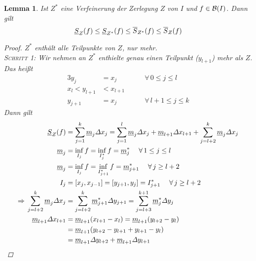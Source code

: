\documentclass[11pt, twoside, a4paper]{article}
\theoremstyle{plain}
\newtheorem{lemma}[blockelement]{Lemma}
\numberwithin{equation}{subsection}
\newcommand{\of}[1]{\mathopen{}\mathclose{}\bgroup\left(#1\aftergroup\egroup\right)}
\newcommand{\interv}[1]{\left[#1\right]}
\newcommand{\impl}[0]{\Rightarrow{}}
\newcommand{\fa}{\;\forall\,}
\newcommand{\mB}{\mathcal{B}}
\begin{document}


    \begin{lemma} %
        \label{lemma:temp-3}
        Ist $Z^{*}$ eine Verfeinerung der Zerlegung $Z$ von $I$ und $f\in \mB\of{I}$. Dann gilt
        \begin{align*}
            \underline{S}_Z\of{f} \leq \underline{S}_{Z^{*}}\of{f} \leq \overline{S}_{Z^{*}}\of{f} \leq \overline{S}_Z\of{f}
        \end{align*}
        \begin{proof}
            $Z^{*}$ enthält alle Teilpunkte von $Z$, nur mehr.\\[10pt]
            \textsc{Schritt 1:} Wir nehmen an $Z^{*}$ enthielte genau einen Teilpunkt ($y_{l+1}$) mehr als $Z$. Das heißt
            \begin{alignat*}{3}
                y_j &= x_j\quad &&\fa 0\leq j \leq l\\
                x_l < y_{l+1} &< x_{l+1}\quad &&\\
                y_{j+1} &= x_j\quad &&\fa l+ 1 \leq j \leq k
            \end{alignat*}
            Dann gilt
            \begin{align*}
                \underline{S}_Z\of{f} &= \sum_{j=1}^{k} \underline{m}_j\varDelta x_j = \sum_{j=1}^{l} \underline{m}_j \varDelta x_j + \underline{m}_{l+1}\varDelta x_{l+1} + \sum_{j=l+2}^{k} \underline{m}_j \varDelta x_j\\
                \underline{m}_j &= \inf_{I_j} f = \inf_{I_j^{*}} f = \underline{m}_j^{*}\quad \fa 1 \leq j \leq l\\
                \underline{m}_j &= \inf_{I_j} f = \inf_{I_{j+1}^{*}}f = \underline{m}_{j+1}^{*}\quad \fa j\geq l+2\\
                I_j &= \interv{x_j, x_{j-1}} = \interv{y_{j+1}, y_j} = I_{j+1}^{*}\quad\fa j \geq l+2\\
                \impl \sum_{j=l+2}^{k} \underline{m}_j \varDelta x_j &= \sum_{j=l+2}^{k} \underline{m}_{j+1}^{*} \varDelta y_{j+1} = \sum_{j=l+3}^{k+1} \underline{m}_j^{*} \varDelta y_{j}\\
                \underline{m}_{l+1} \varDelta x_{l+1} &= \underline{m}_{l+1}\of{x_{l+1} - x_l} = \underline{m}_{l+1}\of{y_{l+2}-y_l}\\
                &= \underline{m}_{l+1}\of{y_{l+2} - y_{l+1} + y_{l+1} - y_l}\\
                &= \underline{m}_{l+1} \varDelta y_{l+2} + \underline{m}_{l+1}\varDelta y_{l+1}\\

\end{align*}
\end{proof}
\end{lemma}
\end{document}
